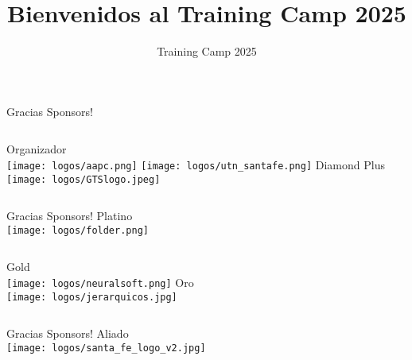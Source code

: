 \documentclass{beamer}
\title %
{Bienvenidos al Training Camp 2025}
\institute[]{Universidad Tecnológica Nacional - Facultad Regional Santa Fe}
\date[TC 2025]{Training Camp 2025}
\begin{document}
\frame{\titlepage}




\begin{frame}{Gracias Sponsors!}
    \begin{columns}[t]
        \centering
        Organizador\\
        \vspace{0.5cm}
        \texttt{[image: logos/aapc.png]}
        \texttt{[image: logos/utn\_santafe.png]}
        \centering
        Diamond Plus\\
        \texttt{[image: logos/GTSlogo.jpeg]}
    \end{columns}
\end{frame}


\begin{frame}{Gracias Sponsors!}
    \centering
    Platino\\
    \texttt{[image: logos/folder.png]}
    
    \vfill
    
    \begin{columns}[b]
        \centering
        Gold\\
        \texttt{[image: logos/neuralsoft.png]}
        \centering
        Oro\\
        \texttt{[image: logos/jerarquicos.jpg]}
    \end{columns}
\end{frame}


\begin{frame}{Gracias Sponsors!}
    \centering
    Aliado\\
    \vspace{1cm}
    \texttt{[image: logos/santa\_fe\_logo\_v2.jpg]}
\end{frame}
\end{document}
